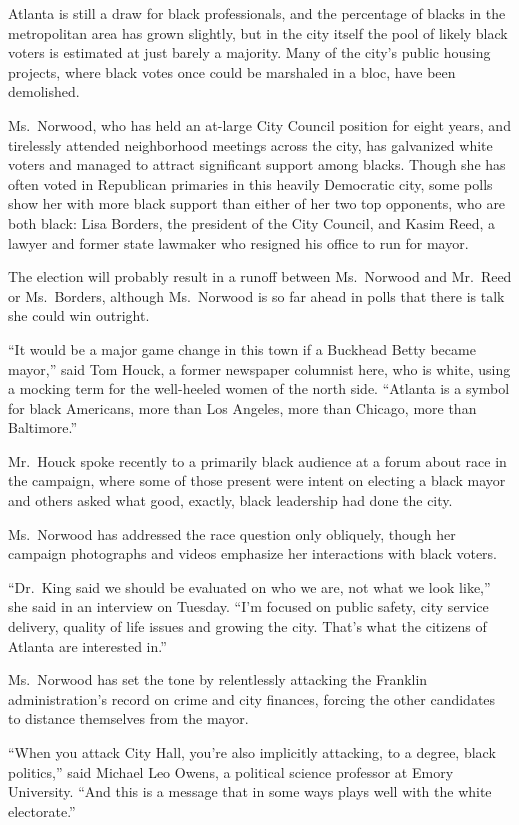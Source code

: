 ﻿\documentclass[12pt]{article}
\begin{document}
Atlanta is still a draw for black professionals, and the percentage of blacks in the metropolitan
area has grown slightly, but in the city itself the pool of likely black voters is estimated at just
barely a majority. Many of the city's public housing projects, where black votes once could be
marshaled in a bloc, have been demolished.

Ms.~Norwood, who has held an at-large City Council position for eight years, and tirelessly attended
neighborhood meetings across the city, has galvanized white voters and managed to attract
significant support among blacks. Though she has often voted in Republican primaries in this heavily
Democratic city, some polls show her with more black support than either of her two top opponents,
who are both black: Lisa Borders, the president of the City Council, and Kasim Reed, a lawyer and
former state lawmaker who resigned his office to run for mayor.

The election will probably result in a runoff between Ms.~Norwood and Mr.~Reed or Ms.~Borders,
although Ms.~Norwood is so far ahead in polls that there is talk she could win outright.

``It would be a major game change in this town if a Buckhead Betty became mayor,'' said Tom Houck, a
former newspaper columnist here, who is white, using a mocking term for the well-heeled women of the
north side. ``Atlanta is a symbol for black Americans, more than Los Angeles, more than Chicago,
more than Baltimore.''

Mr.~Houck spoke recently to a primarily black audience at a forum about race in the campaign, where
some of those present were intent on electing a black mayor and others asked what good, exactly,
black leadership had done the city.

Ms.~Norwood has addressed the race question only obliquely, though her campaign photographs and
videos emphasize her interactions with black voters.

``Dr.~King said we should be evaluated on who we are, not what we look like,'' she said in an
interview on Tuesday. ``I'm focused on public safety, city service delivery, quality of life issues
and growing the city. That's what the citizens of Atlanta are interested in.''

Ms.~Norwood has set the tone by relentlessly attacking the Franklin administration's record on crime
and city finances, forcing the other candidates to distance themselves from the mayor.

``When you attack City Hall, you're also implicitly attacking, to a degree, black politics,'' said
Michael Leo Owens, a political science professor at Emory University. ``And this is a message that
in some ways plays well with the white electorate.''
\end{document}
